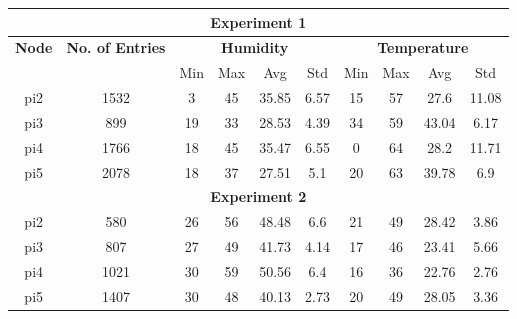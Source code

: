 \documentclass{mprop}
\begin{document}
\begin{table}[]
\centering
\begin{tabular}{|cccccccccc|}
\hline
\multicolumn{10}{|c|}{\textbf{Experiment 1}}                                                                                                                                   \\ \hline
\multicolumn{1}{|c|}{\textbf{Node}} & \multicolumn{1}{c|}{\textbf{No. of Entries}} & \multicolumn{4}{c|}{\textbf{Humidity}}        & \multicolumn{4}{c|}{\textbf{Temperature}} \\ \hline
\multicolumn{1}{|c|}{\textbf{}}     & \multicolumn{1}{c|}{\textbf{}}               & Min & Max & Avg   & \multicolumn{1}{c|}{Std}  & Min     & Max     & Avg       & Std       \\
\multicolumn{1}{|c|}{pi2}           & \multicolumn{1}{c|}{1532}                    & 3   & 45  & 35.85 & \multicolumn{1}{c|}{6.57} & 15      & 57      & 27.6      & 11.08     \\
\multicolumn{1}{|c|}{pi3}           & \multicolumn{1}{c|}{899}                     & 19  & 33  & 28.53 & \multicolumn{1}{c|}{4.39} & 34      & 59      & 43.04     & 6.17      \\
\multicolumn{1}{|c|}{pi4}           & \multicolumn{1}{c|}{1766}                    & 18  & 45  & 35.47 & \multicolumn{1}{c|}{6.55} & 0       & 64      & 28.2      & 11.71     \\
\multicolumn{1}{|c|}{pi5}           & \multicolumn{1}{c|}{2078}                    & 18  & 37  & 27.51 & \multicolumn{1}{c|}{5.1}  & 20      & 63      & 39.78     & 6.9       \\ \hline
\multicolumn{10}{|c|}{\textbf{Experiment 2}}                                                                                                                                   \\ \hline
\multicolumn{1}{|c|}{pi2}           & \multicolumn{1}{c|}{580}                     & 26  & 56  & 48.48 & \multicolumn{1}{c|}{6.6}  & 21      & 49      & 28.42     & 3.86      \\
\multicolumn{1}{|c|}{pi3}           & \multicolumn{1}{c|}{807}                     & 27  & 49  & 41.73 & \multicolumn{1}{c|}{4.14} & 17      & 46      & 23.41     & 5.66      \\
\multicolumn{1}{|c|}{pi4}           & \multicolumn{1}{c|}{1021}                    & 30  & 59  & 50.56 & \multicolumn{1}{c|}{6.4}  & 16      & 36      & 22.76     & 2.76      \\
\multicolumn{1}{|c|}{pi5}           & \multicolumn{1}{c|}{1407}                    & 30  & 48  & 40.13 & \multicolumn{1}{c|}{2.73} & 20      & 49      & 28.05     & 3.36      \\ \hline

\end{tabular}
\end{table}
\end{document}
